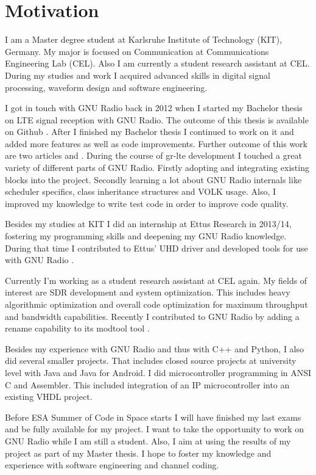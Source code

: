 \documentclass[a4paper,12pt]{scrartcl}
\begin{document}
\section{Motivation}
I am a Master degree student at Karlsruhe Institute of Technology (KIT), Germany.
My major is focused on Communication at Communications Engineering Lab (CEL).
Also I am currently a student research assistant at CEL.
During my studies and work I acquired advanced skills in digital signal processing, waveform design and software engineering.

I got in touch with GNU Radio back in 2012 when I started my Bachelor thesis on {LTE signal reception with GNU Radio}.
The outcome of this thesis is available on Github \cite{repo:gr-lte}.
After I finished my Bachelor thesis I continued to work on it and added more features as well as code improvements.
Further outcome of this work are two articles \cite{lte:winncomm2013} and \cite{lte:springer2015}.
During the course of gr-lte development I touched a great variety of different parts of GNU Radio.
Firstly adopting and integrating existing blocks into the project.
Secondly learning a lot about GNU Radio internals like scheduler specifics, class inheritance structures and VOLK usage.
Also, I improved my knowledge to write test code in order to improve code quality.

Besides my studies at KIT I did an internship at Ettus Research in 2013/14, fostering my programming skills and deepening my GNU Radio knowledge.
During that time I contributed to Ettus' UHD driver and developed tools for use with GNU Radio \cite{repo:gr-misc}.

Currently I'm working as a student research assistant at CEL again.
My fields of interest are SDR development and system optimization.
This includes heavy algorithmic optimization and overall code optimization for maximum throughput and bandwidth capabilities.
Recently I contributed to GNU Radio by adding a rename capability to its modtool tool \cite{repo:gr-rename-contribution}.

Besides my experience with GNU Radio and thus with C++ and Python, I also did several smaller projects.
That includes closed source projects at university level with Java and Java for Android.
I did microcontroller programming in ANSI C and Assembler.
This included integration of an IP microcontroller into an existing VHDL project.

Before ESA Summer of Code in Space starts I will have finished my last exams and be fully available for my project.
I want to take the opportunity to work on GNU Radio while I am still a student.
Also, I aim at using the results of my project as part of my Master thesis.
I hope to foster my knowledge and experience with software engineering and channel coding.
\end{document}
